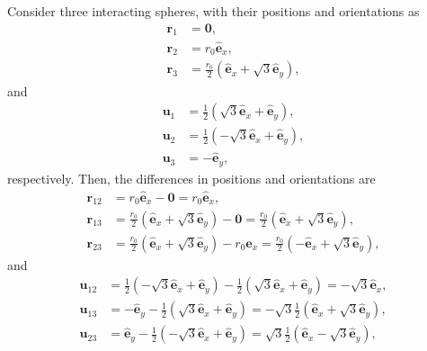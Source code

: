\documentclass[twocolumn,amsmath,amssymb,aps]{revtex4-1}%
\begin{document}
Consider three interacting spheres, with their positions and orientations as
\begin{subequations}
  \label{eqs:3hardspherepositions}
  \begin{align}
    \bm{r}_1 &= \bm{0},\\
    \bm{r}_2 &= r_0\bm{\hat{e}}_x,\\
    \bm{r}_3 &= \frac{r_0}{2}(\bm{\hat{e}}_x+\sqrt{3}\bm{\hat{e}}_y),
  \end{align}
\end{subequations}
and
\begin{subequations}
  \label{eqs:3hardsphereorientations}
  \begin{align}
    \bm{u}_1 &= \frac{1}{2}(\sqrt{3}\bm{\hat{e}}_x+\bm{\hat{e}}_y),\\
    \bm{u}_2 &= \frac{1}{2}(-\sqrt{3}\bm{\hat{e}}_x+\bm{\hat{e}}_y),\\
    \bm{u}_3 &= -\bm{\hat{e}}_y,
  \end{align}
\end{subequations}
respectively. Then, the differences in positions and orientations are
\begin{subequations}
  \label{eqs:3hardsphererelativepositions}
  \begin{align}
    \bm{r}_{12} &= r_0\bm{\hat{e}}_x-\bm{0} = r_0\bm{\hat{e}}_x,\\
    \bm{r}_{13} &= \frac{r_0}{2}(\bm{\hat{e}}_x+\sqrt{3}\bm{\hat{e}}_y)-\bm{0}
    = \frac{r_0}{2}(\bm{\hat{e}}_x+\sqrt{3}\bm{\hat{e}}_y),\\
    \bm{r}_{23} &= \frac{r_0}{2}(\bm{\hat{e}}_x+\sqrt{3}\bm{\hat{e}}_y)
                  -r_0\bm{\hat{e}}_x
    =\frac{r_0}{2}(-\bm{\hat{e}}_x+\sqrt{3}\bm{\hat{e}}_y),
  \end{align}
\end{subequations}
and
\begin{subequations}
  \label{eqs:3hardsphererelativeorientations}
  \begin{align}
    \bm{u}_{12} &= \frac{1}{2}(-\sqrt{3}\bm{\hat{e}}_x+\bm{\hat{e}}_y)
                  -\frac{1}{2}(\sqrt{3}\bm{\hat{e}}_x+\bm{\hat{e}}_y)
    = -\sqrt{3}\bm{\hat{e}}_x,\\
    \bm{u}_{13} &= -\bm{\hat{e}}_y-\frac{1}{2}(\sqrt{3}\bm{\hat{e}}_x
                  +\bm{\hat{e}}_y)
    = -\sqrt{3}\frac{1}{2}(\bm{\hat{e}}_x+\sqrt{3}\bm{\hat{e}}_y),\\
    \bm{u}_{23} &=  \bm{\hat{e}}_y-\frac{1}{2}(-\sqrt{3}\bm{\hat{e}}_x
                  +\bm{\hat{e}}_y)
    = \sqrt{3}\frac{1}{2}(\bm{\hat{e}}_x-\sqrt{3}\bm{\hat{e}}_y),
  \end{align}
\end{subequations}
\end{document}
